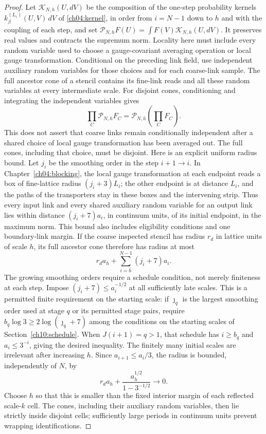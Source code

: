 \begin{proof}
Let $\mathcal K_{N,h}(U,dV)$ be the composition of the one-step probability kernels
$k^{(L_i)}_\beta(U,V)\,dV$ of \eqref{ch04:kernel}, in order from
$i=N-1$ down to $h$ and with the coupling of each step, and set
$\mathcal P_{N,h}F(U)=\int F(V)\mathcal K_{N,h}(U,dV)$.
It preserves real values and contracts the supremum norm. Locality here
must include every random variable used to choose a gauge-covariant averaging operation or local gauge
transformation. Conditional on the preceding link field, use independent auxiliary
random variables for those choices and for each coarse-link sample.
The full ancestor cone of a stencil contains its fine-link reads and
all these random variables at every intermediate scale. For disjoint
cones, conditioning and integrating the independent variables gives
\begin{equation}
 \prod_C\mathcal P_{N,h}F_C
                   =\mathcal P_{N,h}\left(\prod_CF_C\right).
 \label{ch13:cone-factorization}
\end{equation}
This does not assert that coarse links remain conditionally independent
after a shared choice of local gauge transformation has been averaged out. The full cones,
including that choice, must be disjoint. Here is an explicit uniform
radius bound. Let $j_i$ be the smoothing order in the step $i+1\to i$.
In Chapter~\ref{ch04:blocking}, the local gauge transformation at each endpoint reads a box of
fine-lattice radius $(j_i+3)L_i$; the other endpoint is at distance
$L_i$, and the paths of the transporters stay in these boxes and the intervening
strip. Thus every input link and every shared auxiliary random variable for an output
link lies within distance $(j_i+7)a_i$, in continuum units, of its initial endpoint,
in the maximum norm. This bound also includes eligibility conditions and
one boundary-link margin. If the coarse inspected stencil has radius
$r_d$ in lattice units of scale $h$, its full ancestor cone therefore has radius at
most
\[
 r_da_h+\sum_{i=h}^{N-1}(j_i+7)a_i.
\]
The growing smoothing orders require a schedule condition, not merely
finiteness at each step. Impose $(j_i+7)\le a_i^{-1/2}$ at all sufficiently
late scales. This is a permitted finite requirement on the starting scale: if
$\jmath_q$ is the largest smoothing order used at stage $q$ or its
permitted stage pairs, require
$b_q\log3\ge2\log(\jmath_q+7)$ among the conditions on the starting scales of
Section~\ref{ch10:schedule}. When $J(i+1)=q>1$, that schedule has
$i\ge b_q$ and $a_i\le3^{-i}$, giving the desired inequality.
The finitely many initial scales are irrelevant after increasing $h$.
Since $a_{i+1}\le a_i/3$, the radius is bounded, independently of $N$, by
\[
 r_da_h+\frac{a_h^{1/2}}{1-3^{-1/2}}\longrightarrow0.
\]
Choose $h$ so that this is smaller than the fixed interior margin of
each reflected scale-$k$ cell. The cones, including their auxiliary random variables,
then lie strictly inside disjoint cells; sufficiently large
periods in continuum units prevent wrapping identifications.


\end{proof}
